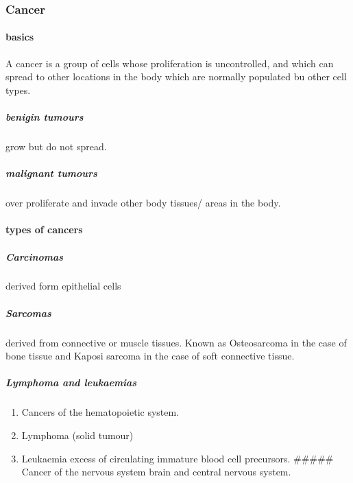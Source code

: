 \documentclass[]{article}
\providecommand{\tightlist}{%
  \setlength{\itemsep}{0pt}\setlength{\parskip}{0pt}}
\let\oldparagraph\paragraph
\renewcommand{\paragraph}[1]{\oldparagraph{#1}\mbox{}}
\let\oldsubparagraph\subparagraph
\renewcommand{\subparagraph}[1]{\oldsubparagraph{#1}\mbox{}}
\begin{document}
\hypertarget{cancer}{%
\subsubsection{Cancer}\label{cancer}}

\hypertarget{basics}{%
\paragraph{basics}\label{basics}}

A cancer is a group of cells whose proliferation is uncontrolled, and
which can spread to other locations in the body which are normally
populated bu other cell types.

\hypertarget{benigin-tumours}{%
\subparagraph{benigin tumours}\label{benigin-tumours}}

grow but do not spread.

\hypertarget{malignant-tumours}{%
\subparagraph{malignant tumours}\label{malignant-tumours}}

over proliferate and invade other body tissues/ areas in the body.

\hypertarget{types-of-cancers}{%
\paragraph{types of cancers}\label{types-of-cancers}}

\hypertarget{carcinomas}{%
\subparagraph{Carcinomas}\label{carcinomas}}

derived form epithelial cells

\hypertarget{sarcomas}{%
\subparagraph{Sarcomas}\label{sarcomas}}

derived from connective or muscle tissues. Known as Osteosarcoma in the
case of bone tissue and Kaposi sarcoma in the case of soft connective
tissue.

\hypertarget{lymphoma-and-leukaemias}{%
\subparagraph{Lymphoma and leukaemias}\label{lymphoma-and-leukaemias}}

\begin{enumerate}
\def\labelenumi{\arabic{enumi}.}
\tightlist
\item
  Cancers of the hematopoietic system.
\item
  Lymphoma (solid tumour)
\item
  Leukaemia excess of circulating immature blood cell precursors.
  \#\#\#\#\# Cancer of the nervous system brain and central nervous
  system.
\end{enumerate}
\end{document}

